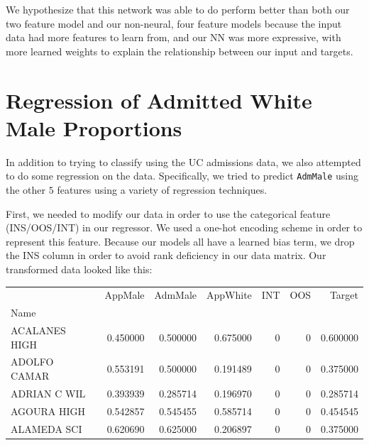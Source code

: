 \documentclass{article}
\begin{document}
We hypothesize that this network was able to do perform better than both our two feature model and our non-neural, four feature models because the input data had more features to learn from, and our NN was more expressive, with more learned weights to explain the relationship between our input and targets.

\section{Regression of Admitted White Male Proportions}

In addition to trying to classify using the UC admissions data, we also attempted to do some regression on the data. Specifically, we tried to predict \texttt{AdmMale} using the other $5$ features using a variety of regression techniques.

First, we needed to modify our data in order to use the categorical feature (INS/OOS/INT) in our regressor. We used a one-hot encoding scheme in order to represent this feature. Because our models all have a learned bias term, we drop the INS column in order to avoid rank deficiency in our data matrix. Our transformed data looked like this:

\newline

\begin{tabular}{lrrrrrr}
\toprule
{} &  AppMale &  AdmMale &  AppWhite &  INT &  OOS &  Target \\
Name                        &                    &                    &                     &               &               &                   \\
\midrule
ACALANES HIGH           &           0.450000 &           0.500000 &            0.675000 &             0 &             0 &          0.600000 \\
ADOLFO CAMAR   &           0.553191 &           0.500000 &            0.191489 &             0 &             0 &          0.375000 \\
ADRIAN C WIL    &           0.393939 &           0.285714 &            0.196970 &             0 &             0 &          0.285714 \\
AGOURA HIGH             &           0.542857 &           0.545455 &            0.585714 &             0 &             0 &          0.454545 \\
ALAMEDA SCI &           0.620690 &           0.625000 &            0.206897 &             0 &             0 &          0.375000 \\
\bottomrule
\end{tabular}
\end{document}
